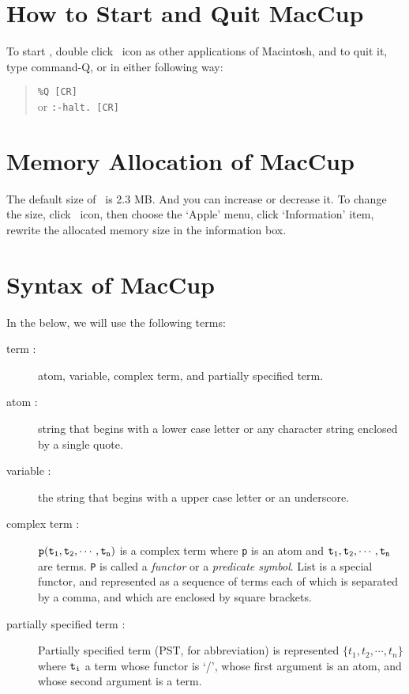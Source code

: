 \section{How to Start and Quit MacCup}
To start \cuprolog, double click \cuprolog\ icon as other applications
of Macintosh, and to quit it, type command-Q, or in either following
way:
\begin{quote}
        {\tt \%Q [CR]}\\
	or {\tt :-halt. [CR]} 
\end{quote}

\section{Memory Allocation of MacCup}
The default size of \cuprolog\ is 2.3 MB.  And you can increase or
decrease it.  To change the size,
click \cuprolog\ icon, then choose the `Apple' menu, click `Information'
item, rewrite the allocated memory size in the information box.

\section{Syntax of MacCup}
In the below, we will use the following terms:
\begin{description}
\item [term :] atom, variable, complex term, and partially specified term. 
\item [atom :] string that begins with a lower case letter or any
character string enclosed by a single quote.
\item [variable :] the string that begins with a upper case letter or an
underscore. 
\item [complex term :] 
${\tt p(t_{1},t_{2},\cdots,t_{n})}$ is a complex term where
{\tt p} is an atom and ${\tt t_{1},t_{2},\cdots,t_{n}}$ are terms.
{\tt P} is called a {\em functor} or a {\em predicate symbol}. 
List is a special functor, and represented as a sequence of terms
each of which is separated by a comma, and which are enclosed by
square brackets.
\item [partially specified term :]  
Partially specified term (PST, for abbreviation) is represented
 ${\{t_{1}, t_{2}, \cdots, t_{n}\}}$ where ${\tt t_{i}}$ a term
 whose functor is `/', whose first argument is an atom, and whose
second argument is a term.
\end{description}

